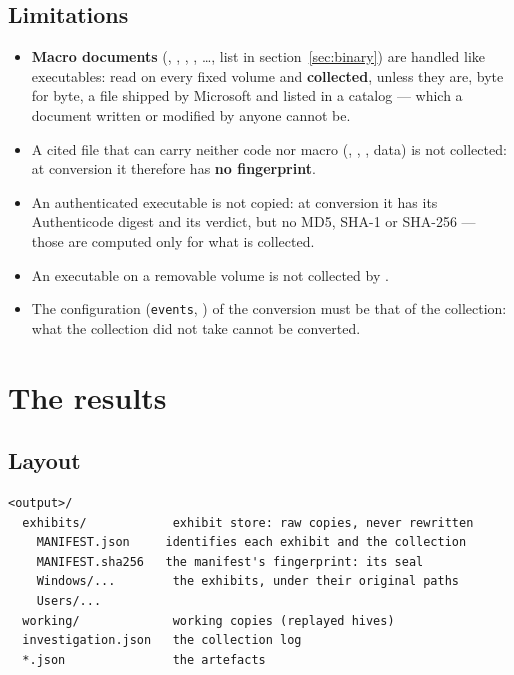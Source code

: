 \documentclass[11pt,a4paper,oneside]{report}
\begin{document}
\section{Limitations}

\begin{itemize}
  \item \textbf{Macro documents} (, ,
        , , \ldots, list in
        section~\ref{sec:binary}) are handled like executables: read on every
        fixed volume and \textbf{collected}, unless they are, byte for byte, a
        file shipped by Microsoft and listed in a catalog — which a document
        written or modified by anyone cannot be.
  \item A cited file that can carry neither code nor macro (,
        , , data) is not collected: at conversion it
        therefore has \textbf{no fingerprint}.
  \item An authenticated executable is not copied: at conversion it has its
        Authenticode digest and its verdict, but no MD5, SHA-1 or SHA-256 —
        those are computed only for what is collected.
  \item An executable on a removable volume is not collected by
         .
  \item The configuration (\texttt{events}, ) of the conversion
        must be that of the collection: what the collection did not take cannot be
        converted.
\end{itemize}

\chapter{The results}

\section{Layout}

\begin{lstlisting}
<output>/
  exhibits/            exhibit store: raw copies, never rewritten
    MANIFEST.json     identifies each exhibit and the collection
    MANIFEST.sha256   the manifest's fingerprint: its seal
    Windows/...        the exhibits, under their original paths
    Users/...
  working/             working copies (replayed hives)
  investigation.json   the collection log
  *.json               the artefacts
\end{lstlisting}
\end{document}
